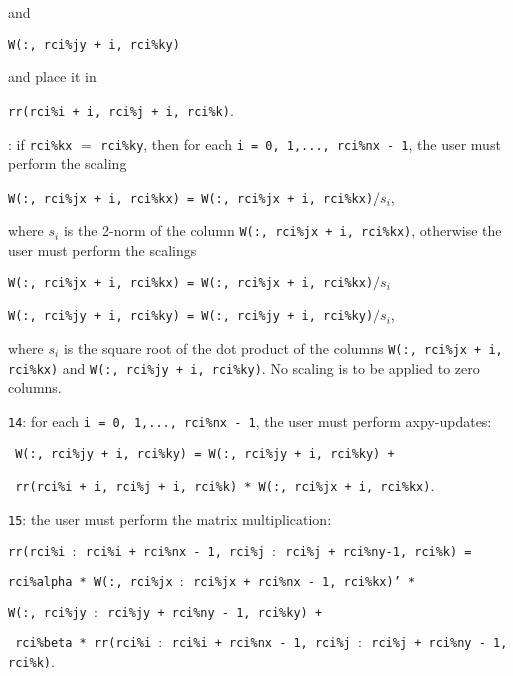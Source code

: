 \begin{description}
\begin{description}
and

\hspace{8mm}
{\tt W(:, rci\%jy + i, rci\%ky)}

and place it in 

\hspace{8mm}
{\tt rr(rci\%i + i, rci\%j + i, rci\%k)}.
%
\item[\texttt{13}]: 
if {\tt rci\%kx} $=$ {\tt rci\%ky}, then
for each
{\tt i = 0, 1,..., rci\%nx - 1}, 
the user must perform the scaling

\hspace{8mm}
{\tt W(:, rci\%jx + i, rci\%kx) = W(:, rci\%jx + i, rci\%kx)$/s_i$},

where $s_i$ is the 2-norm of the column 
{\tt W(:, rci\%jx + i, rci\%kx)},
otherwise the user must perform the scalings

\hspace{8mm}
{\tt W(:, rci\%jx + i, rci\%kx) = W(:, rci\%jx + i, rci\%kx)$/s_i$}

\hspace{8mm}
{\tt W(:, rci\%jy + i, rci\%ky) = W(:, rci\%jy + i, rci\%ky)$/s_i$},

where $s_i$ is the square root of the dot product of 
the columns 
{\tt W(:, rci\%jx + i, rci\%kx)} and
{\tt W(:, rci\%jy + i, rci\%ky)}.
No scaling is to be applied to zero columns.
%
\item
{\tt 14}: 
for each {\tt i = 0, 1,..., rci\%nx - 1}, 
the user must perform axpy-updates:

\hspace{8mm}
{\tt 
W(:, rci\%jy + i, rci\%ky) = 
W(:, rci\%jy + i, rci\%ky) + 
}

\hspace{12mm}
{\tt
rr(rci\%i + i, rci\%j + i, rci\%k) * W(:, rci\%jx + i, rci\%kx)}.
%
\item
{\tt 15}: the user must perform the matrix multiplication:

\hspace{8mm}
{\tt rr(rci\%i $:$ rci\%i + rci\%nx - 1, rci\%j $:$ 
rci\%j + rci\%ny-1, rci\%k) =}

\hspace{12mm}
{\tt rci\%alpha *
W(:, rci\%jx $:$ rci\%jx + rci\%nx - 1, rci\%kx)' *}

\hspace{16mm}
{\tt W(:, rci\%jy $:$ rci\%jy + rci\%ny - 1, rci\%ky) +}

\hspace{12mm}
{\tt 
rci\%beta *
rr(rci\%i $:$ rci\%i + rci\%nx - 1, rci\%j $:$ rci\%j + rci\%ny - 1, rci\%k)}.


\end{description}
\end{description}
